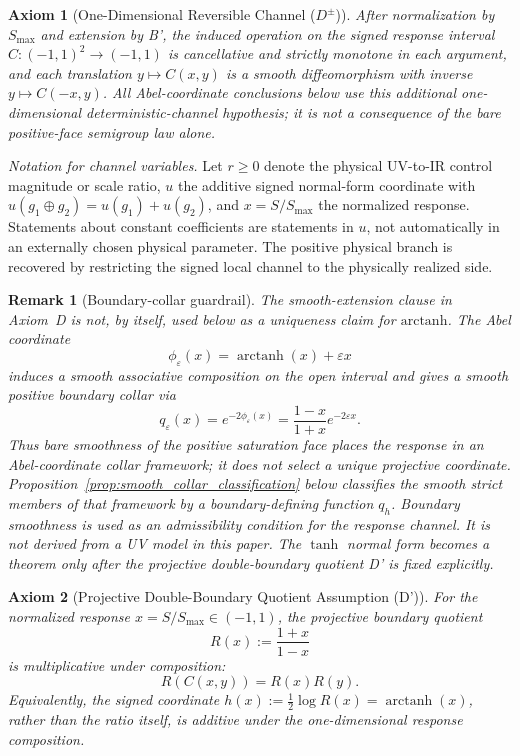 \documentclass[aps,prd,twocolumn,superscriptaddress,nofootinbib]{revtex4-2}
\newtheorem{remark}{Remark}
\newtheorem{axiom}{Axiom}
\begin{document}
\begin{axiom}[One-Dimensional Reversible Channel ($D^\pm$)]
\label{ax:reversible_channel}
After normalization by $S_{\max}$ and extension by B', the induced operation on the signed response interval $C:(-1,1)^2\to(-1,1)$ is cancellative and strictly monotone in each argument, and each translation $y\mapsto C(x,y)$ is a smooth diffeomorphism with inverse $y\mapsto C(-x,y)$. All Abel-coordinate conclusions below use this additional one-dimensional deterministic-channel hypothesis; it is not a consequence of the bare positive-face semigroup law alone.
\end{axiom}

\textit{Notation for channel variables.} Let $r\geq0$ denote the physical UV-to-IR control magnitude or scale ratio, $u$ the additive signed normal-form coordinate with $u(g_1\oplus g_2)=u(g_1)+u(g_2)$, and $x=S/S_{\max}$ the normalized response. Statements about constant coefficients are statements in $u$, not automatically in an externally chosen physical parameter. The positive physical branch is recovered by restricting the signed local channel to the physically realized side.

\begin{remark}[Boundary-collar guardrail]
The smooth-extension clause in Axiom~D is not, by itself, used below as a uniqueness claim for $\mathrm{arctanh}$. The Abel coordinate
\[
  \phi_\varepsilon(x)=\operatorname{arctanh}(x)+\varepsilon x
\]
induces a smooth associative composition on the open interval and gives a smooth positive boundary collar via
\[
  q_\varepsilon(x)=e^{-2\phi_\varepsilon(x)}
  =\frac{1-x}{1+x}e^{-2\varepsilon x}.
\]
Thus bare smoothness of the positive saturation face places the response in an Abel-coordinate collar framework; it does not select a unique projective coordinate. Proposition~\ref{prop:smooth_collar_classification} below classifies the smooth strict members of that framework by a boundary-defining function $q_h$. Boundary smoothness is used as an admissibility condition for the response channel. It is not derived from a UV model in this paper. The $\tanh$ normal form becomes a theorem only after the projective double-boundary quotient D' is fixed explicitly.
\end{remark}

\begin{axiom}[Projective Double-Boundary Quotient Assumption (D')]
\label{ax:projective_quotient}
For the normalized response $x=S/S_{\max}\in(-1,1)$, the projective boundary quotient
\[
  R(x):=\frac{1+x}{1-x}
\]
is multiplicative under composition:
\begin{equation}
  R(C(x,y))=R(x)R(y).
  \label{eq:projective_quotient}
\end{equation}
Equivalently, the signed coordinate $h(x):=\frac12\log R(x)=\operatorname{arctanh}(x)$, rather than the ratio itself, is additive under the one-dimensional response composition.
\end{axiom}
\end{document}
